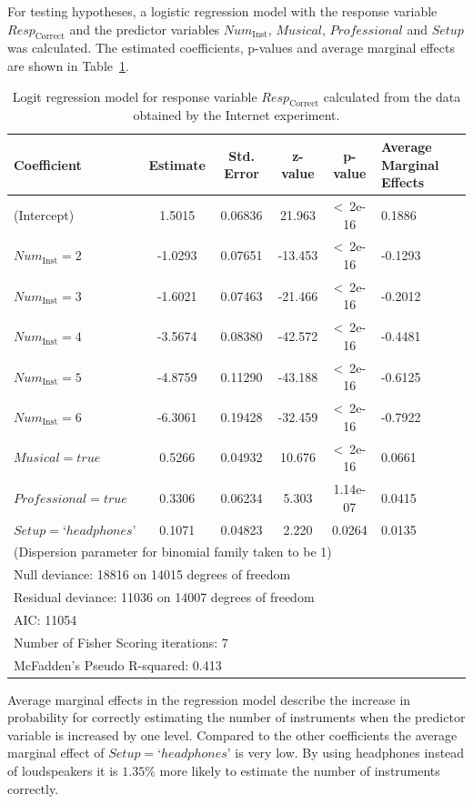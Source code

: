 For testing hypotheses, a logistic regression model with the response variable $\textit{Resp}_{\mathrm{Correct}}$ and the predictor variables $\textit{Num}_{\mathrm{Inst}}$, $\textit{Musical}$, $\textit{Professional}$ and $\textit{Setup}$ was calculated.
The estimated coefficients, p-values and average marginal effects are shown in Table~\ref{table:data_web_lm}.
\tabcolsep=5.5pt
\begin{table}[t]
\center
\scriptsize
\begin{tabular}{p{1.5cm}ccccp{0.8cm}}
\toprule[1.5pt]
Coefficient & Estimate & Std. Error & z-value & p-value & Average Marginal Effects \\
\midrule
(Intercept) & 1.5015 & 0.06836 & 21.963 & \textless~2e-16 & 0.1886 \\
$\textit{Num}_{\mathrm{Inst}} = 2$ & -1.0293 & 0.07651 & -13.453  & \textless~2e-16 & -0.1293\\
$\textit{Num}_{\mathrm{Inst}} = 3$ & -1.6021 & 0.07463 & -21.466  & \textless~2e-16 & -0.2012\\
$\textit{Num}_{\mathrm{Inst}} = 4$ & -3.5674 & 0.08380 & -42.572  & \textless~2e-16 & -0.4481\\
$\textit{Num}_{\mathrm{Inst}} = 5$ & -4.8759 & 0.11290 & -43.188  & \textless~2e-16 & -0.6125\\
$\textit{Num}_{\mathrm{Inst}} = 6$ & -6.3061 & 0.19428 & -32.459  & \textless~2e-16 & -0.7922\\
$\textit{Musical} = true$ & 0.5266 & 0.04932 & 10.676  & \textless~2e-16 & 0.0661\\
$\textit{Professional} = true$ & 0.3306 & 0.06234 & 5.303  & 1.14e-07 & 0.0415\\
$\textit{Setup} = \textrm{`}headphones\textrm{'}$ & 0.1071 & 0.04823 & 2.220  & 0.0264 & 0.0135\\
\midrule
\multicolumn{6}{l}{(Dispersion parameter for binomial family taken to be 1)}\\
\multicolumn{6}{l}{Null deviance: 18816  on 14015  degrees of freedom}\\
\multicolumn{6}{l}{Residual deviance: 11036  on 14007  degrees of freedom}\\
\multicolumn{6}{l}{AIC: 11054}\\
\multicolumn{6}{l}{Number of Fisher Scoring iterations: 7}\\
\multicolumn{6}{l}{McFadden's Pseudo R-squared: 0.413}\\
\bottomrule[1.5pt]
\end{tabular}
\tabcolsep=6pt
\caption{Logit regression model for response variable $\textit{Resp}_{\mathrm{Correct}}$ calculated from the data obtained by the Internet experiment.}
\label{table:data_web_lm}
\end{table}
Average marginal effects in the regression model describe the increase in probability for correctly estimating the number of instruments when the predictor variable is increased by one level. Compared to the other coefficients the average marginal effect of $\textit{Setup} = \textrm{`}headphones\textrm{'}$ is very low. By using headphones instead of loudspeakers it is $1.35\%$ more likely to estimate the number of instruments correctly.


